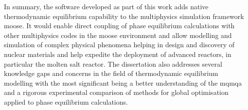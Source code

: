 	In summary, the software developed as part of this work adds native thermodynamic equilibrium capability to the multiphysics simulation framework \gls{moose}. It would enable direct coupling of phase equilibrium calculations with other multiphysics codes in the \gls{moose} environment and allow modelling and simulation of complex physical phenomena helping in design and discovery of nuclear materials and help expedite the deployment of advanced reactors, in particular the molten salt reactor. The dissertation also addresses several knowledge gaps and concerns in the field of thermodynamic equilibrium modelling with the most significant being a better understanding of the \gls{mqmqa} and a rigorous experimental comparison of methods for global optimisation applied to phase equilibrium calculations.
	
	
	